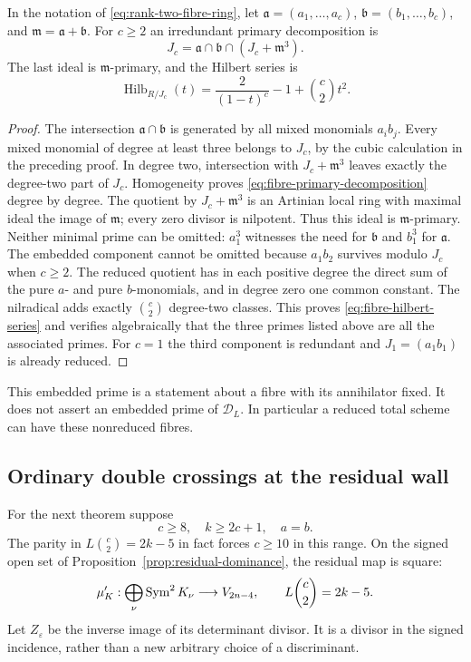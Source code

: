 \begin{proposition}
\label{prop:fibre-primary-decomposition}
In the notation of \eqref{eq:rank-two-fibre-ring}, let
$\mathfrak a=(a_1,\ldots,a_c)$, $\mathfrak b=(b_1,\ldots,b_c)$,
and $\mathfrak m=\mathfrak a+\mathfrak b$. For $c\ge2$ an
irredundant primary decomposition is
\begin{equation}\label{eq:fibre-primary-decomposition}
 J_c=\mathfrak a\cap\mathfrak b\cap(J_c+\mathfrak m^3).
\end{equation}
The last ideal is $\mathfrak m$-primary, and the Hilbert series is
\begin{equation}\label{eq:fibre-hilbert-series}
 \operatorname{Hilb}_{R/J_c}(t)
   =\frac{2}{(1-t)^c}-1+\binom c2t^2.
\end{equation}
\end{proposition}
\begin{proof}
The intersection $\mathfrak a\cap\mathfrak b$ is generated by all
mixed monomials $a_i b_j$. Every mixed monomial of degree at least
three belongs to $J_c$, by the cubic calculation in the preceding
proof. In degree two, intersection with $J_c+\mathfrak m^3$ leaves
exactly the degree-two part of $J_c$. Homogeneity proves
\eqref{eq:fibre-primary-decomposition} degree by degree.
The quotient by $J_c+\mathfrak m^3$ is an Artinian local ring with
maximal ideal the image of $\mathfrak m$; every zero divisor is
nilpotent. Thus this ideal is $\mathfrak m$-primary. Neither minimal
prime can be omitted: $a_1^3$ witnesses the need for $\mathfrak b$
and $b_1^3$ for $\mathfrak a$. The embedded component cannot be
omitted because $a_1b_2$ survives modulo $J_c$ when $c\ge2$.
The reduced quotient has in each positive degree the direct sum of
the pure $a$- and pure $b$-monomials, and in degree zero one common
constant. The nilradical adds exactly $\binom c2$ degree-two
classes. This proves \eqref{eq:fibre-hilbert-series} and verifies
algebraically that the three primes listed above are all the
associated primes. For $c=1$ the third component is redundant and
$J_1=(a_1b_1)$ is already reduced.
\end{proof}

This embedded prime is a statement about a fibre with its annihilator
fixed. It does not assert an embedded prime of $\mathscr D_L$.
In particular a reduced total scheme can have these nonreduced fibres.

\subsection{Ordinary double crossings at the residual wall}
For the next theorem suppose
\begin{equation}\label{eq:wall-hypotheses}
 c\ge8,\quad k\ge2c+1,\quad a=b.
\end{equation}
The parity in $L\binom c2=2k-5$ in fact forces $c\ge10$ in this
range. On the signed open set of
Proposition~\ref{prop:residual-dominance}, the residual map is square:
\[
 \mu_K':\bigoplus_\nu\operatorname{Sym}^2K_\nu\longrightarrow V_{2n-4},
 \qquad L\binom c2=2k-5.
\]
Let $Z_\varepsilon$ be the inverse image of its determinant divisor.
It is a divisor in the signed incidence, rather than a new arbitrary
choice of a discriminant.


